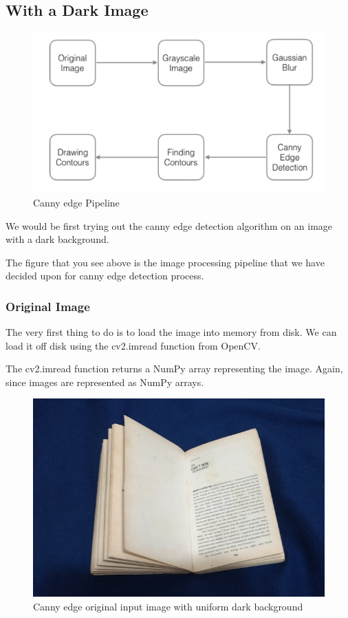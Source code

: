 \documentclass[BTech]{srmuthesis}
\begin{document}
\subsection{With a Dark Image}

\begin{figure}[h]
    \centering
    \includegraphics[width=16cm\textwidth]{canny_pipeline}
    \caption{Canny edge Pipeline}
    \label{fig:canny edge pipeline}
\end{figure}

We would be first trying out the canny edge detection algorithm on an image with a dark background.

The figure that you see above is the image processing pipeline that we have decided upon for canny edge detection process.

\newpage

\subsubsection{Original Image}

The very first thing to do is to load the image into memory from disk. We can load it off disk using the cv2.imread function from OpenCV. 

The cv2.imread function returns a NumPy array representing the image. Again, since images are represented as NumPy arrays.

\begin{figure}[h!]
    \centering
    \includegraphics[width=15cm\textwidth]{canny-edge-in1}
    \caption{Canny edge original input image with uniform dark background}
    \label{fig:Canny edge input with uniform background}
\end{figure}
\end{document}
